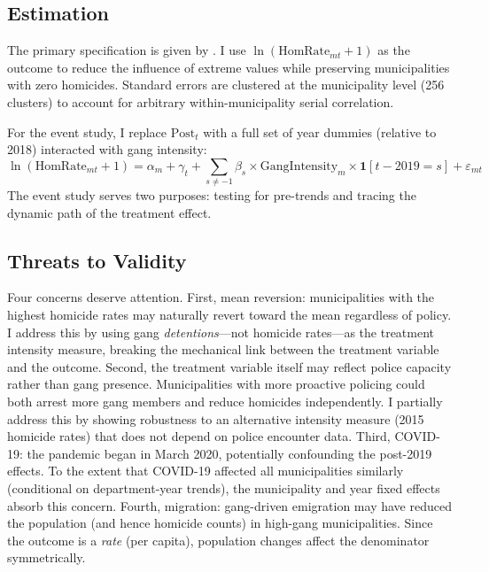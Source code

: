 \documentclass[12pt]{article}
\begin{document}
\subsection{Estimation}

The primary specification is given by . I use $\ln(\text{HomRate}_{mt} + 1)$ as the outcome to reduce the influence of extreme values while preserving municipalities with zero homicides. Standard errors are clustered at the municipality level (256 clusters) to account for arbitrary within-municipality serial correlation.

For the event study, I replace $\text{Post}_t$ with a full set of year dummies (relative to 2018) interacted with gang intensity:
\begin{equation}
\ln(\text{HomRate}_{mt} + 1) = \alpha_m + \gamma_t + \sum_{s \neq -1} \beta_s \times \text{GangIntensity}_m \times \mathbf{1}[t - 2019 = s] + \varepsilon_{mt}
\end{equation}
The event study serves two purposes: testing for pre-trends and tracing the dynamic path of the treatment effect.

\subsection{Threats to Validity}

Four concerns deserve attention. First, mean reversion: municipalities with the highest homicide rates may naturally revert toward the mean regardless of policy. I address this by using gang \textit{detentions}---not homicide rates---as the treatment intensity measure, breaking the mechanical link between the treatment variable and the outcome. Second, the treatment variable itself may reflect police capacity rather than gang presence. Municipalities with more proactive policing could both arrest more gang members and reduce homicides independently. I partially address this by showing robustness to an alternative intensity measure (2015 homicide rates) that does not depend on police encounter data. Third, COVID-19: the pandemic began in March 2020, potentially confounding the post-2019 effects. To the extent that COVID-19 affected all municipalities similarly (conditional on department-year trends), the municipality and year fixed effects absorb this concern. Fourth, migration: gang-driven emigration may have reduced the population (and hence homicide counts) in high-gang municipalities. Since the outcome is a \textit{rate} (per capita), population changes affect the denominator symmetrically.
\end{document}
